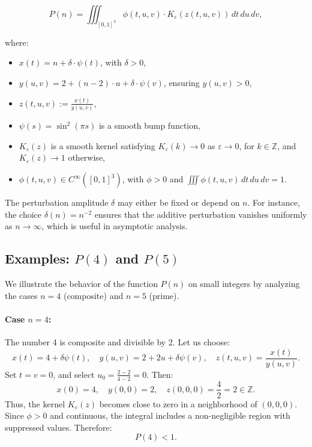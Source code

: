 \documentclass[12pt]{article}
\theoremstyle{definition}
\theoremstyle{plain}
\theoremstyle{remark}
\begin{document}
\begin{equation}
P(n) = \iiint_{[0,1]^3} \phi(t,u,v) \cdot K_\varepsilon\left( z(t,u,v) \right) \, dt \, du \, dv,
\end{equation}

where:
\begin{itemize}
  \item \( x(t) = n + \delta \cdot \psi(t) \), with \( \delta > 0 \),
  \item \( y(u,v) = 2 + (n - 2) \cdot u + \delta \cdot \psi(v) \), ensuring \( y(u,v) > 0 \),
  \item \( z(t,u,v) := \frac{x(t)}{y(u,v)} \),
  \item \( \psi(s) = \sin^2(\pi s) \) is a smooth bump function,
  \item \( K_\varepsilon(z) \) is a smooth kernel satisfying \( K_\varepsilon(k) \to 0 \) as \( \varepsilon \to 0 \), for \( k \in \mathbb{Z} \), and \( K_\varepsilon(z) \to 1 \) otherwise,
  \item \( \phi(t,u,v) \in C^\infty([0,1]^3) \), with \( \phi > 0 \) and \( \iiint \phi(t,u,v) \, dt \, du \, dv = 1 \).
\end{itemize}

The perturbation amplitude \( \delta \) may either be fixed or depend on \( n \). For instance, the choice \( \delta(n) = n^{-2} \) ensures that the additive perturbation vanishes uniformly as \( n \to \infty \), which is useful in asymptotic analysis.

\subsection*{Examples: \( P(4) \) and \( P(5) \)}

We illustrate the behavior of the function \( P(n) \) on small integers by analyzing the cases \( n = 4 \) (composite) and \( n = 5 \) (prime).

\paragraph{Case \( n = 4 \):}  
The number 4 is composite and divisible by 2. Let us choose:
\[
x(t) = 4 + \delta \psi(t), \quad y(u,v) = 2 + 2u + \delta \psi(v),
\quad z(t,u,v) = \frac{x(t)}{y(u,v)}.
\]
Set \( t = v = 0 \), and select \( u_0 = \frac{2 - 2}{4 - 2} = 0 \). Then:
\[
x(0) = 4, \quad y(0,0) = 2, \quad z(0,0,0) = \frac{4}{2} = 2 \in \mathbb{Z}.
\]
Thus, the kernel \( K_\varepsilon(z) \) becomes close to zero in a neighborhood of \( (0,0,0) \). Since \( \phi > 0 \) and continuous, the integral includes a non-negligible region with suppressed values. Therefore:
\[
P(4) < 1.
\]
\end{document}
